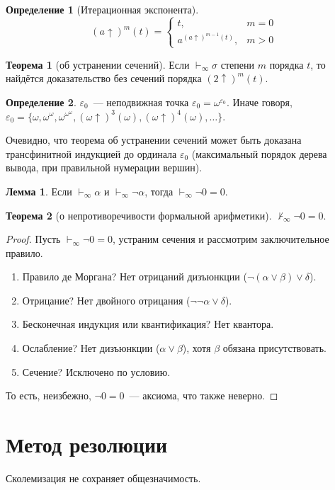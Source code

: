 \documentclass[a4paper,11pt]{article}
\theoremstyle{definition}
\newtheorem*{thm}{Теорема}
\newtheorem*{lmm}{Лемма}
\newtheorem*{dfn}{Определение}
\newcommand{\proves}{\vdash}
\begin{document}
\begin{dfn}[Итерационная экспонента]
\[
(a\uparrow)^m(t) =
\begin{cases}
t, & m = 0\\
a^{(a\uparrow)^{m-1}(t)}, & m > 0
\end{cases}
\]
\end{dfn}
\begin{thm}[об устранении сечений]
Если $\proves_\infty \sigma$ степени $m$ порядка $t$, то найдётся доказательство
без сечений порядка $(2\uparrow)^m(t)$.
\end{thm}
\begin{dfn}
$\varepsilon_0$~--- неподвижная точка $\varepsilon_0 = \omega^{\varepsilon_0}$.
Иначе говоря, $\varepsilon_0 = \{\omega, \omega^\omega, \omega^{\omega^\omega},
(\omega\uparrow)^3(\omega), (\omega\uparrow)^4(\omega), \dots\}$.
\end{dfn}
Очевидно, что теорема об устранении сечений может быть доказана трансфинитной
индукцией до ординала $\varepsilon_0$ (максимальный порядок дерева вывода, при
правильной нумерации вершин).

\begin{lmm}
Если $\proves_\infty \alpha$ и $\proves_\infty \neg\alpha$, тогда $\proves_\infty
\neg 0 = 0$.
\end{lmm}
\begin{thm}[о непротиворечивости формальной арифметики]
$\nvdash_\infty \neg 0 = 0$.
\end{thm}
\begin{proof}
Пусть $\proves_\infty \neg 0 = 0$, устраним сечения и рассмотрим заключительное
правило.
\begin{enumerate}
\item Правило де Моргана? Нет отрицаний дизъюнкции ($\neg(\alpha \vee \beta)
  \vee \delta$).
\item Отрицание? Нет двойного отрицания ($\neg\neg\alpha \vee \delta$).
\item Бесконечная индукция или квантификация? Нет квантора.
\item Ослабление? Нет дизъюнкции ($\alpha \vee \beta$), хотя $\beta$ обязана
  присутствовать.
\item Сечение? Исключено по условию.
\end{enumerate}
То есть, неизбежно, $\neg 0 = 0$~--- аксиома, что также неверно.
\end{proof}

\section{Метод резолюции}
Сколемизация не сохраняет общезначимость.
\end{document}
